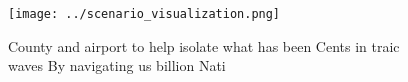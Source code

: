 \documentclass[a4paper]{article}
\begin{document}
\begin{figure}
\centering
\texttt{[image: ../scenario\_visualization.png]}
\caption{County and airport to help isolate what has been Cents in traic waves By navigating us billion Nati
}
\end{figure}
 
\end{document}
